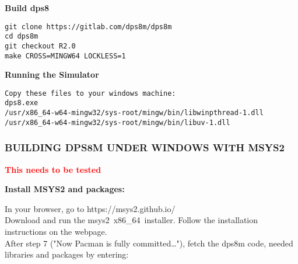 \textbf{Build dps8}

\begin{adjustwidth}{5ex}{1ex}
    \texttt{git clone https://gitlab.com/dps8m/dps8m} \\
    \texttt{cd dps8m} \\
    \texttt{git checkout R2.0} \\
    \texttt{make CROSS=MINGW64 LOCKLESS=1} \\
\end{adjustwidth}

\textbf{Running the Simulator}

\begin{adjustwidth}{5ex}{1ex}
    \texttt{Copy these files to your windows machine:} \\
    \texttt{dps8.exe} \\
    \texttt{/usr/x86\_64-w64-mingw32/sys-root/mingw/bin/libwinpthread-1.dll} \\
    \texttt{/usr/x86\_64-w64-mingw32/sys-root/mingw/bin/libuv-1.dll} \\
\end{adjustwidth}

\newpage

\subsubsection[Building dps8m under Windows with MSYS2]{BUILDING DPS8M UNDER WINDOWS WITH MSYS2}

\textbf{\textcolor{red}{This needs to be tested}}

\textbf{Install MSYS2 and packages:}

In your browser, go to https://msys2.github.io/ \\

Download and run the msys2\ x86\_64\ installer. Follow the installation
instructions on the webpage. \\

After step 7 ("Now Pacman is fully committed…"), fetch the dps8m
code, needed libraries and packages by entering: \\

